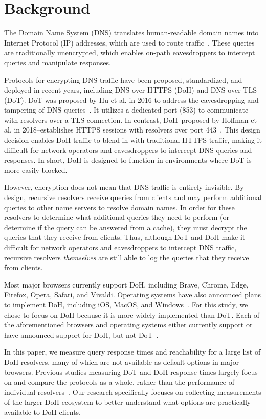 \section{Background}\label{sec:back}
The Domain Name System (DNS) translates human-readable domain names into Internet Protocol (IP) addresses, which are used to route traffic~\cite{dns-rfcs}.
These queries are traditionally unencrypted, which enables on-path eavesdroppers to intercept queries and manipulate responses.

Protocols for encrypting DNS traffic have been proposed, standardized, and deployed in recent years, including DNS-over-HTTPS (DoH) and DNS-over-TLS (DoT).
DoT was proposed by Hu et al. in 2016 to address the eavesdropping and tampering of DNS queries~\cite{hu2016DoT}.
It utilizes a dedicated port (853) to communicate with resolvers over a TLS connection.
In contrast, DoH--proposed by Hoffman et al. in 2018--establishes HTTPS sessions with resolvers over port 443~\cite{hoffman2018DoH}.
This design decision enables DoH traffic to blend in with traditional HTTPS traffic, making it difficult for network operators and eavesdroppers to intercept DNS queries and responses.
In short, DoH is designed to function in environments where DoT is more easily blocked.

However, encryption does not mean that DNS traffic is entirely invisible.
By design, recursive resolvers receive queries from clients and may perform additional queries to other name servers to resolve domain names.
In order for these resolvers to determine what additional queries they need to perform (or determine if the query can be answered from a cache), they must decrypt the queries that they receive from clients.
Thus, although DoT and DoH make it difficult for network operators and eavesdroppers to intercept DNS traffic, recursive resolvers \emph{themselves} are still able to log the queries that they receive from clients.

Most major browsers currently support DoH, including Brave, Chrome, Edge, Firefox, Opera, Safari, and Vivaldi.
Operating systems have also announced plans to implement DoH, including iOS, MacOS, and Windows~\cite{ffSettings,operaEdgeSettings,vivaldiSettings,iosSettings,jensen2020windows}.
For this study, we chose to focus on DoH because it is more widely implemented than DoT.
Each of the aforementioned browsers and operating systems either currently support or have announced support for DoH, but not DoT~\cite{lack-of-dot-support}.

In this paper, we measure query response times and reachability for a large list of DoH resolvers, many of which are not available as default options in major browsers.
Previous studies measuring DoT and DoH response times largely focus on and compare the protocols as a whole, rather than the performance of individual resolvers~\cite{lu2019end-to-end}.
Our research specifically focuses on collecting measurements of the larger DoH ecosystem to better understand what options are practically available to DoH clients.

